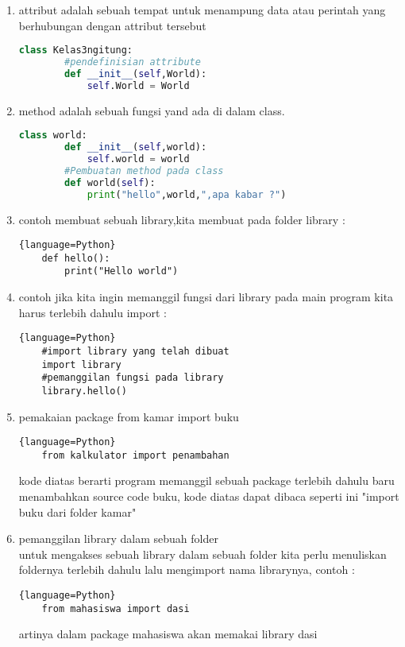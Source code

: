 \begin{enumerate}
				\item attribut adalah sebuah tempat untuk menampung data atau perintah yang berhubungan dengan attribut tersebut
				\begin{lstlisting}[language=Python]
	class Kelas3ngitung:
		#pendefinisian attribute
	    def __init__(self,World):
	        self.World = World
				\end{lstlisting}
				
				\item method adalah sebuah fungsi yand ada di dalam class.
				\begin{lstlisting}[language=Python]
	class world:
	    def __init__(self,world):
	        self.world = world
	    #Pembuatan method pada class
	    def world(self):
	       	print("hello",world,",apa kabar ?")
				\end{lstlisting}
				
				\item contoh membuat sebuah library,kita membuat pada folder library :
				\begin{lstlisting}{language=Python}
	def hello():
	    print("Hello world")
				\end{lstlisting}
	
	            \newpage
				\item contoh jika kita ingin memanggil fungsi dari library pada main program kita harus terlebih dahulu import :
				\begin{lstlisting}{language=Python}
	#import library yang telah dibuat
	import library
	#pemanggilan fungsi pada library
	library.hello()
				\end{lstlisting}
				
				\item pemakaian package from kamar import buku
				\begin{lstlisting}{language=Python}
	from kalkulator import penambahan
				\end{lstlisting}
	kode diatas berarti program memanggil sebuah package terlebih dahulu baru menambahkan source code buku, kode diatas dapat dibaca seperti ini "import buku dari folder kamar"
	
				\item pemanggilan library dalam sebuah folder\\
				untuk mengakses sebuah library dalam sebuah folder kita perlu menuliskan foldernya terlebih dahulu lalu mengimport nama librarynya, contoh :
				\begin{lstlisting}{language=Python}
	from mahasiswa import dasi
				\end{lstlisting}
	artinya dalam package mahasiswa akan memakai library dasi
	

\end{enumerate}

